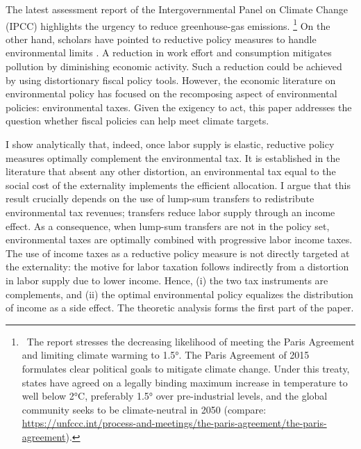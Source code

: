 The latest assessment report of the Intergovernmental Panel on Climate Change (IPCC) \citep{IPCC2022} highlights the urgency to reduce greenhouse-gas emissions.%
\footnote{ \  The report stresses the decreasing likelihood of meeting the Paris Agreement and limiting climate warming to 1.5°. The Paris Agreement of 2015 formulates clear political goals to mitigate climate change. Under this treaty, states have agreed on a legally binding maximum increase in temperature to well below 2°C, preferably 1.5° over pre-industrial levels, and the global community seeks to be climate-neutral in 2050  (compare: \url{https://unfccc.int/process-and-meetings/the-paris-agreement/the-paris-agreement}). 
}
On the other hand, scholars have pointed to reductive policy measures to handle environmental limits \citep{Arrow2004AreMuch, Schor2005SustainableReduction, Dasgupta2021}. A reduction in work effort and consumption mitigates pollution by diminishing economic activity. Such a reduction could be achieved by using distortionary fiscal policy tools.
However, the economic literature on environmental policy has focused on the recomposing aspect of environmental policies: environmental taxes. %
Given the exigency to act, this paper addresses the question whether fiscal policies can help meet climate targets.

I show analytically that, indeed, once 
labor supply is elastic, reductive policy measures optimally complement the environmental tax. 
It is established in the literature that absent any other distortion, an environmental tax equal to the social cost of the externality implements the efficient allocation. I argue that this result crucially depends on the use of lump-sum transfers to redistribute environmental tax revenues; transfers reduce labor supply through an income effect. 
 As a consequence,  when lump-sum transfers are not in the policy set, environmental taxes are optimally combined with progressive labor income taxes. The use of income taxes as a reductive policy measure is not directly targeted at the externality: the motive for labor taxation follows indirectly from a distortion in labor supply due to lower income. Hence, (i) the two tax instruments are complements, and %
(ii) the optimal environmental policy equalizes the distribution of income as  a side effect. The theoretic analysis forms the first part of the paper.

